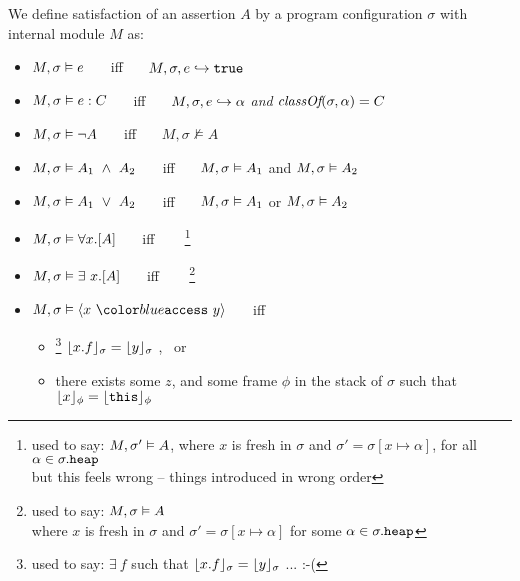 \begin{definition} 
\label{def:chainmail-semantics}
We define satisfaction of an assertion $A$ by a program configuration $\sigma$ with internal module $M$ as:
\begin{itemize}
\item
$M , \sigma \vDash e$ \ \ \ iff \ \ \  $M, \sigma, e \hookrightarrow \texttt{true}$
\item
$M , \sigma \vDash e : C$ \ \ \ iff \ \ \  $M, \sigma, e \hookrightarrow \alpha$ \textit{and} $\textit{classOf}(\sigma, \alpha) = C$
\item
$M , \sigma \vDash \neg A$ \ \ \ iff \ \ \  ${M},{\sigma}\nvDash{A}$
\item
$\satisfiesA{M}{\sigma}{A_1\ \wedge\ A_2}$ \ \ \ iff \ \ \  $M , \sigma \vDash A_1$ and 
$M , \sigma \vDash A_2$
\item
$\satisfiesA{M}{\sigma}{A_1\ \vee\ A_2}$ \ \ \ iff \ \ \  $M , \sigma \vDash A_1$ or 
$M , \sigma \vDash A_2$
\item
$M , \sigma \vDash \forall x.[A]$ \ \ \ iff \ \ \  
\footnote{used to say: $M , \sigma' \vDash A$, 
where $x$ is fresh in $\sigma$ and $\sigma' = \sigma[x \mapsto \alpha]$, 
for all $\alpha \in \sigma.{\texttt{heap}}$
\\
but this feels wrong -- things introduced in wrong order}
\item
$M , \sigma \vDash \exists\ x.[A]$ \ \ \ iff \ \ \  
\footnote{used to say: $M , \sigma \vDash A$ \\
where $x$ is fresh in $\sigma$ and $\sigma' = \sigma[x \mapsto \alpha]$
for some $\alpha \in \sigma.{\texttt{heap}}$}
\item
$\satisfiesA{M}{\sigma}{\access{x}{y}}$ \ \ \ iff \ \ \  
\begin{itemize}
\item
\footnote{used to say: $\exists\ f$ such that $\lfloor x.f \rfloor_{\sigma}={\lfloor y \rfloor_{\sigma}}$ ... :-(}
$\lfloor x.f \rfloor_{\sigma}={\lfloor y \rfloor_{\sigma}}$ , \  or
\item
there exists some $z$, and some frame $\phi$ in the stack of $\sigma$ such that $\lfloor x \rfloor_{\phi}=\lfloor {\texttt{this}} \rfloor_{\phi}$ 

\end{itemize}
\end{itemize}
\end{definition}
